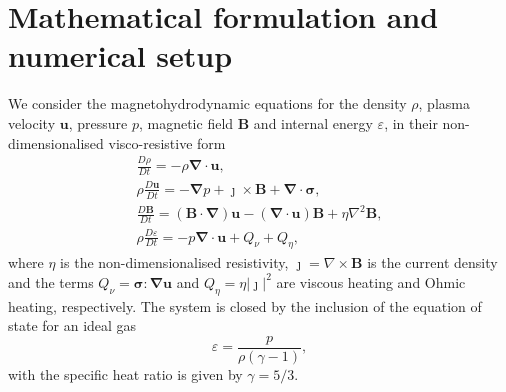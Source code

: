\documentclass[fleqn,usenatbib]{mnras}
\newcommand{\rs}[2]{{#2}}
\newcommand{\ten}[1]{{\bm #1}}
\renewcommand{\vec}[1]{{\bm #1}}
\begin{document}
\section{\rs{Numerical setup}{Mathematical formulation and numerical setup}}
\label{sec-numerical-setup}

\rs{Lare3d numerically solves}{We consider} the
\rs{MHD}{magnetohydrodynamic} equations for the density $\rho$, plasma
velocity $\vec{u}$, pressure $p$, magnetic field $\vec{B}$ and
internal energy $\varepsilon$, \rs{}{in their non-dimensionalised
  visco-resistive form}
\begin{subequations}
  \label{eq:MHD}
  \begin{gather}
\label{eq:mhda}
\frac{D\rho}{Dt} = - \rho \vec{\nabla} \cdot \vec{u},\\
\rho\frac{D\vec{u}}{Dt} = -\vec{\nabla} p + \vec{\jmath} \times \vec{B} + \vec{\nabla} \cdot \ten{\sigma},\\
\frac{D\vec{B}}{Dt} = (\vec{B} \cdot \vec{\nabla})\vec{u} - (\vec{\nabla} \cdot \vec{u})\vec{B} + \eta \nabla^2 \vec{B},\\
\rho\frac{D\varepsilon}{Dt} = -p \vec{\nabla} \cdot \vec{u} + {Q}_{\nu} + {Q}_{\eta},%
    \end{gather}
\end{subequations}
where $\eta$ is the non-dimensionalised resistivity,
$\rs{\jmath}{\vec{\jmath}} = \nabla \times \vec{B}$ is the current
density and \rs{$\ten{\sigma}$ is the viscous stress tensor (described
  below). The}{the} terms ${Q}_{\nu} = \ten{\sigma} : \vec{\nabla}\vec{u}$
  and ${Q}_{\eta} = \eta | \vec{\jmath} |^2$ are viscous heating and
  Ohmic heating, respectively. The system is closed by the inclusion
  of the equation of state for an ideal gas 
\begin{equation}
\varepsilon = \frac{p}{\rho(\gamma - 1)},
\end{equation}
\rs{where}{with} the specific heat ratio is given by $\gamma = 5/3$.
\end{document}
